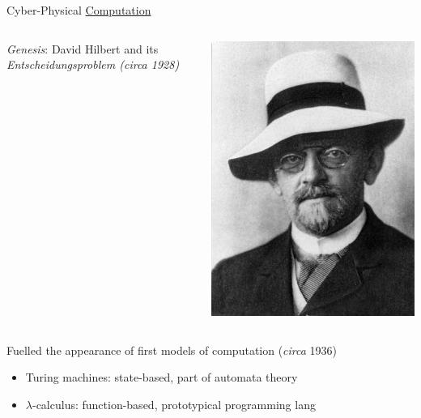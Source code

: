 \documentclass{beamer}
\begin{document}
\begin{frame}{Cyber-Physical \underline{Computation}}

  \begin{minipage}[0.3\textheight]{\textwidth}
  \begin{columns}[c]
  \begin{column}{0.6\textwidth}
    \emph{Genesis}: David Hilbert and its \emph{\alert{Entscheidungsproblem} (\emph{circa} 1928)}
  \end{column}
  \begin{column}{0.2\textwidth}
    \includegraphics[scale=0.15]{Images/Hilbert.jpg}
  \end{column}
  \end{columns}
  \end{minipage}

  \vspace{0.5cm}
  Fuelled the appearance of first models of computation (\emph{circa} 1936)
  \begin{itemize}
  \item Turing machines: state-based, part of \alert{automata} theory
  \item $\lambda$-calculus: function-based, prototypical
          \alert{programming} lang
  \end{itemize}
\end{frame}
\end{document}
